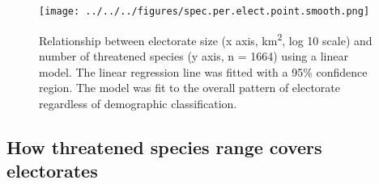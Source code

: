 \documentclass[a4paper,11pt]{article}
\begin{document}

\begin{figure}[H]
	\centering
    \texttt{[image: ../../../figures/spec.per.elect.point.smooth.png]}
    \caption{Relationship between electorate size (x axis, km\textsuperscript{2}, log 10 scale) and number of threatened species (y axis, n = 1664) using a linear model. The linear regression line was fitted with a 95\% confidence region. The model was fit to the overall pattern of electorate regardless of demographic classification.}
    \label{fig:point_smooth}
\end{figure}

\subsection{How threatened species range covers electorates}
\end{document}
